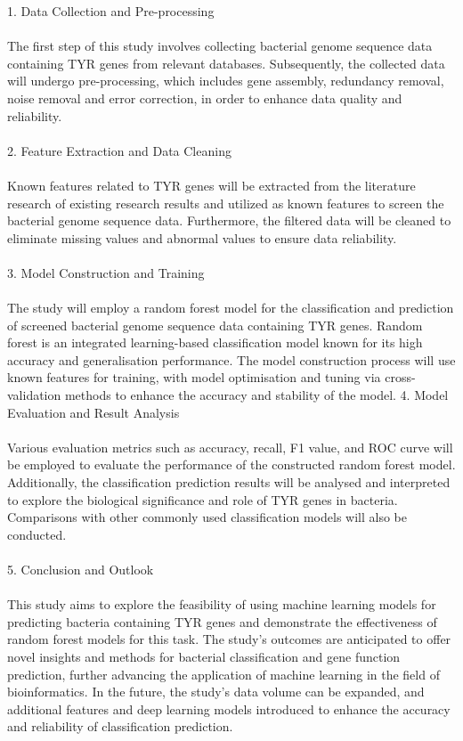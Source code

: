 \documentclass{article}
\begin{document}
1. Data Collection and Pre-processing\\\\
   The first step of this study involves collecting bacterial genome sequence data containing TYR genes from relevant databases. Subsequently, the collected data will undergo pre-processing, which includes gene assembly, redundancy removal, noise removal and error correction, in order to enhance data quality and reliability.\\\\
2. Feature Extraction and Data Cleaning\\\\
   Known features related to TYR genes will be extracted from the literature research of existing research results and utilized as known features to screen the bacterial genome sequence data. Furthermore, the filtered data will be cleaned to eliminate missing values and abnormal values to ensure data reliability.\\\\
3. Model Construction and Training\\\\
   The study will employ a random forest model for the classification and prediction of screened bacterial genome sequence data containing TYR genes. Random forest is an integrated learning-based classification model known for its high accuracy and generalisation performance. The model construction process will use known features for training, with model optimisation and tuning via cross-validation methods to enhance the accuracy and stability of the model.
4. Model Evaluation and Result Analysis\\\\
   Various evaluation metrics such as accuracy, recall, F1 value, and ROC curve will be employed to evaluate the performance of the constructed random forest model. Additionally, the classification prediction results will be analysed and interpreted to explore the biological significance and role of TYR genes in bacteria. Comparisons with other commonly used classification models will also be conducted.\\\\
5. Conclusion and Outlook\\\\
   This study aims to explore the feasibility of using machine learning models for predicting bacteria containing TYR genes and demonstrate the effectiveness of random forest models for this task. The study's outcomes are anticipated to offer novel insights and methods for bacterial classification and gene function prediction, further advancing the application of machine learning in the field of bioinformatics. In the future, the study's data volume can be expanded, and additional features and deep learning models introduced to enhance the accuracy and reliability of classification prediction.\\\\
\end{document}
